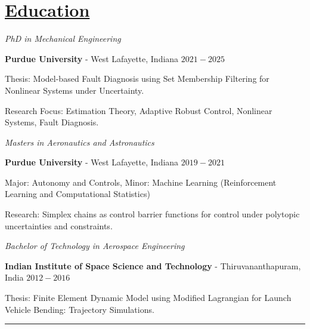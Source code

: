 \section*{\underline{Education}}

\noindent \textit{PhD in Mechanical Engineering}

\textbf{Purdue University} - West Lafayette, Indiana \hfill $2021 - 2025$

Thesis: Model-based Fault Diagnosis using Set Membership Filtering for Nonlinear Systems under Uncertainty.

Research Focus: Estimation Theory, Adaptive Robust Control, Nonlinear Systems, Fault Diagnosis.

\medskip

\noindent \textit{Masters in Aeronautics and Astronautics}

\textbf{Purdue University} - West Lafayette, Indiana \hfill $2019 - 2021$

Major: Autonomy and Controls, Minor: Machine Learning (Reinforcement Learning and Computational Statistics)

Research: Simplex chains as control barrier functions for control under polytopic uncertainties and constraints.

\medskip

\noindent \textit{Bachelor of Technology in Aerospace Engineering }

\textbf{Indian Institute of Space Science and Technology} - Thiruvananthapuram, India \hfill $2012 - 2016 $

Thesis: Finite Element Dynamic Model using Modified Lagrangian for Launch Vehicle Bending: Trajectory Simulations.

\noindent\rule{\textwidth}{0.4pt}

